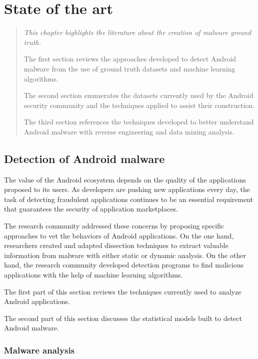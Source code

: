 \chapter{State of the art}
\label{chapter:related}

\begin{quote}
{\itshape
This chapter highlights the literature about the creation of malware ground truth.

The first section reviews the approaches developed to detect Android malware from the use of ground truth datasets and machine learning algorithms.

The second section enumerates the datasets currently used by the Android security community and the techniques applied to assist their construction.

The third section references the techniques developed to better understand Android malware with reverse engineering and data mining analysis.
}
\end{quote}

\localtableofcontents{}

\section{Detection of Android malware}
The value of the Android ecosystem depends on the quality of the applications proposed to its users.
As developers are pushing new applications every day, the task of detecting fraudulent applications continues to be an essential requirement that guarantees the security of application marketplaces.

The research community addressed these concerns by proposing specific approaches to vet the behaviors of Android applications.
On the one hand, researchers created and adapted dissection techniques to extract valuable information from malware with either static or dynamic analysis.
On the other hand, the research community developed detection programs to find malicious applications with the help of machine learning algorithms.

The first part of this section reviews the techniques currently used to analyze Android applications.

The second part of this section discusses the statistical models built to detect Android malware.
\subsection{Malware analysis}
